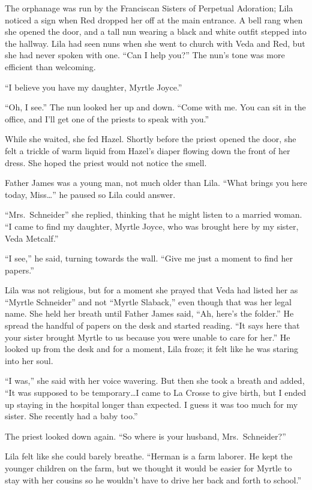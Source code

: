 \documentclass[
  american,
  letterpaper,
]{book}
\begin{document}
The orphanage was run by the Franciscan Sisters of Perpetual Adoration;
Lila noticed a sign when Red dropped her off at the main entrance. A
bell rang when she opened the door, and a tall nun wearing a black and
white outfit stepped into the hallway. Lila had seen nuns when she went
to church with Veda and Red, but she had never spoken with one. ``Can I
help you?'' The nun's tone was more efficient than welcoming.

``I believe you have my daughter, Myrtle Joyce.''

``Oh, I see.'' The nun looked her up and down. ``Come with me. You can
sit in the office, and I'll get one of the priests to speak with you.''

While she waited, she fed Hazel. Shortly before the priest opened the
door, she felt a trickle of warm liquid from Hazel's diaper flowing down
the front of her dress. She hoped the priest would not notice the smell.

Father James was a young man, not much older than Lila. ``What brings
you here today, Miss\ldots{}'' he paused so Lila could answer.

``Mrs.~Schneider'' she replied, thinking that he might listen to a
married woman. ``I came to find my daughter, Myrtle Joyce, who was
brought here by my sister, Veda Metcalf.''

``I see,'' he said, turning towards the wall. ``Give me just a moment to
find her papers.''

Lila was not religious, but for a moment she prayed that Veda had listed
her as ``Myrtle Schneider'' and not ``Myrtle Slaback,'' even though that
was her legal name. She held her breath until Father James said, ``Ah,
here's the folder.'' He spread the handful of papers on the desk and
started reading. ``It says here that your sister brought Myrtle to us
because you were unable to care for her.'' He looked up from the desk
and for a moment, Lila froze; it felt like he was staring into her soul.

``I was,'' she said with her voice wavering. But then she took a breath
and added, ``It was supposed to be temporary\ldots I came to La Crosse
to give birth, but I ended up staying in the hospital longer than
expected. I guess it was too much for my sister. She recently had a baby
too.''

The priest looked down again. ``So where is your husband,
Mrs.~Schneider?''

Lila felt like she could barely breathe. ``Herman is a farm laborer. He
kept the younger children on the farm, but we thought it would be easier
for Myrtle to stay with her cousins so he wouldn't have to drive her
back and forth to school.''
\end{document}

